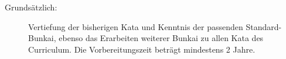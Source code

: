 	\begin{description}
	\item[Grundsätzlich:]Vertiefung der bisherigen Kata und Kenntnis der passenden Standard-Bunkai, ebenso das Erarbeiten weiterer Bunkai zu allen Kata des Curriculum. Die Vorbereitungszeit beträgt mindestens 2 Jahre.
	\end{description}
